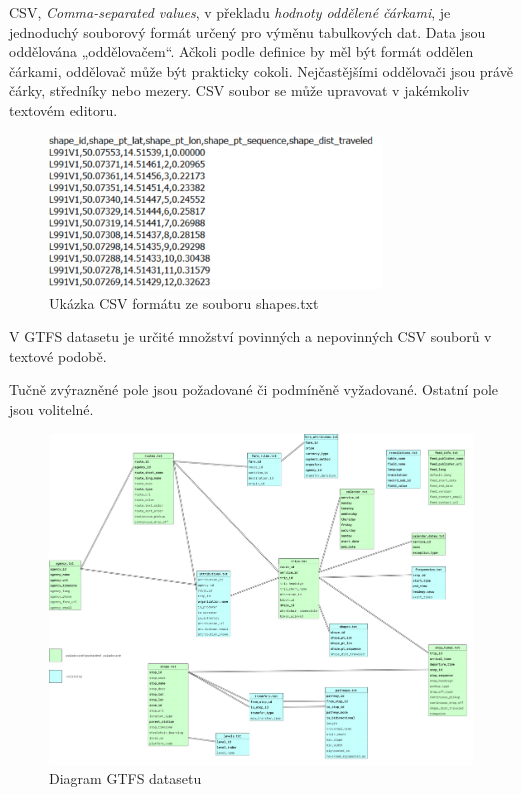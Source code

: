CSV, \textit{Comma-separated values}, v překladu \textit{hodnoty oddělené čárkami}, je jednoduchý 
souborový formát určený pro výměnu tabulkových dat. Data jsou oddělována „oddělovačem“.
Ačkoli podle definice by měl být formát oddělen čárkami, oddělovač může být prakticky cokoli. 
Nejčastějšími oddělovači jsou právě čárky, středníky nebo mezery. CSV soubor se 
může upravovat v jakémkoliv textovém editoru.
\begin{figure}[H] \centering
    \includegraphics[width=250pt]{./pictures/ukazka-csv.PNG}
    \caption[Ukázka CSV formátu ze souboru shapes.txt]{Ukázka CSV formátu ze souboru shapes.txt}
	\label{fig:ukazka-csv}              
\end{figure}
V GTFS datasetu je určité množství povinných a nepovinných CSV souborů v textové podobě.
 

Tučně zvýrazněné pole jsou požadované či podmíněně vyžadované. Ostatní pole jsou 
volitelné. 
\begin{figure}[H] \centering
    \includegraphics[width=400pt]{./pictures/GTFS-diagram.PNG}
    \caption[Diagram GTFS datasetu]{Diagram GTFS datasetu}
	\label{fig:GTFS-diagram}              
\end{figure}

